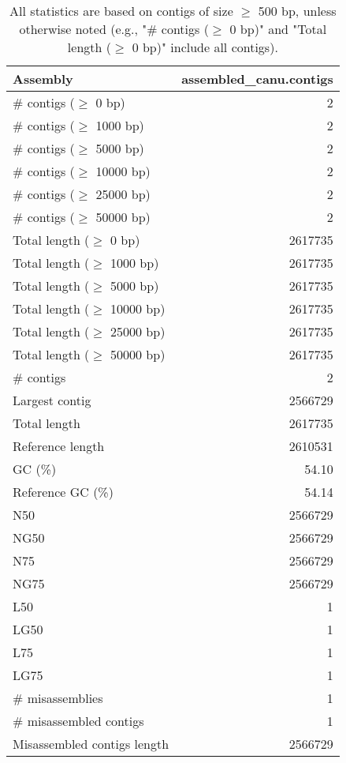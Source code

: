 \documentclass[12pt,a4paper]{article}
\begin{document}
\begin{table}[ht]
\begin{center}
\caption{All statistics are based on contigs of size $\geq$ 500 bp, unless otherwise noted (e.g., "\# contigs ($\geq$ 0 bp)" and "Total length ($\geq$ 0 bp)" include all contigs).}
\begin{tabular}{|l*{1}{|r}|}
\hline
Assembly & assembled\_canu.contigs \\ \hline
\# contigs ($\geq$ 0 bp) & 2 \\ \hline
\# contigs ($\geq$ 1000 bp) & 2 \\ \hline
\# contigs ($\geq$ 5000 bp) & 2 \\ \hline
\# contigs ($\geq$ 10000 bp) & 2 \\ \hline
\# contigs ($\geq$ 25000 bp) & 2 \\ \hline
\# contigs ($\geq$ 50000 bp) & 2 \\ \hline
Total length ($\geq$ 0 bp) & 2617735 \\ \hline
Total length ($\geq$ 1000 bp) & 2617735 \\ \hline
Total length ($\geq$ 5000 bp) & 2617735 \\ \hline
Total length ($\geq$ 10000 bp) & 2617735 \\ \hline
Total length ($\geq$ 25000 bp) & 2617735 \\ \hline
Total length ($\geq$ 50000 bp) & 2617735 \\ \hline
\# contigs & 2 \\ \hline
Largest contig & 2566729 \\ \hline
Total length & 2617735 \\ \hline
Reference length & 2610531 \\ \hline
GC (\%) & 54.10 \\ \hline
Reference GC (\%) & 54.14 \\ \hline
N50 & 2566729 \\ \hline
NG50 & 2566729 \\ \hline
N75 & 2566729 \\ \hline
NG75 & 2566729 \\ \hline
L50 & 1 \\ \hline
LG50 & 1 \\ \hline
L75 & 1 \\ \hline
LG75 & 1 \\ \hline
\# misassemblies & 1 \\ \hline
\# misassembled contigs & 1 \\ \hline
Misassembled contigs length & 2566729 \\ \hline

\end{tabular}
\end{center}
\end{table}
\end{document}
